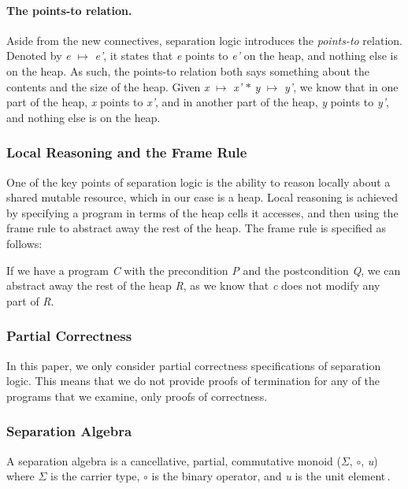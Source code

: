 \paragraph{The points-to relation.}
Aside from the new connectives, separation logic introduces the {\it points-to} relation. Denoted by {\it e} $\mapsto$ {\it e'}, it states that {\it e} points to {\it e'} on the heap, and nothing else is on the heap. As such, the points-to relation both says something about the contents and the size of the heap. Given {\it x} $\mapsto$ {\it x'} $\ast$ {\it y} $\mapsto$ {\it y'}, we know that in one part of the heap, {\it x} points to {\it x'}, and in another part of the heap, {\it y} points to {\it y'}, and nothing else is on the heap.

\subsubsection{Local Reasoning and the Frame Rule}
One of the key points of separation logic is the ability to reason locally about a shared mutable resource, which in our case is a heap. Local reasoning is achieved by specifying a program in terms of the heap cells  it accesses, and then using the frame rule to abstract away the rest of the heap. The frame rule is specified as follows:

\begin{prooftree}
\end{prooftree}

If we have a program {\it C} with the precondition {\it P} and the postcondition {\it Q}, we can abstract away the rest of the heap {\it R}, as we know that {\it c} does not modify any part of {\it R}.

\subsubsection{Partial Correctness}
In this paper, we only consider partial correctness specifications of separation logic. This means that we do not provide proofs of termination for any of the programs that we examine, only proofs of correctness.


\subsubsection{Separation Algebra}
A separation algebra is a cancellative, partial, commutative monoid ($\Sigma$, $\circ$, {\it u}) where $\Sigma$ is the carrier type, $\circ$ is the binary operator, and {\it u} is the unit element\,\cite{Calcagno07:LCS}.

